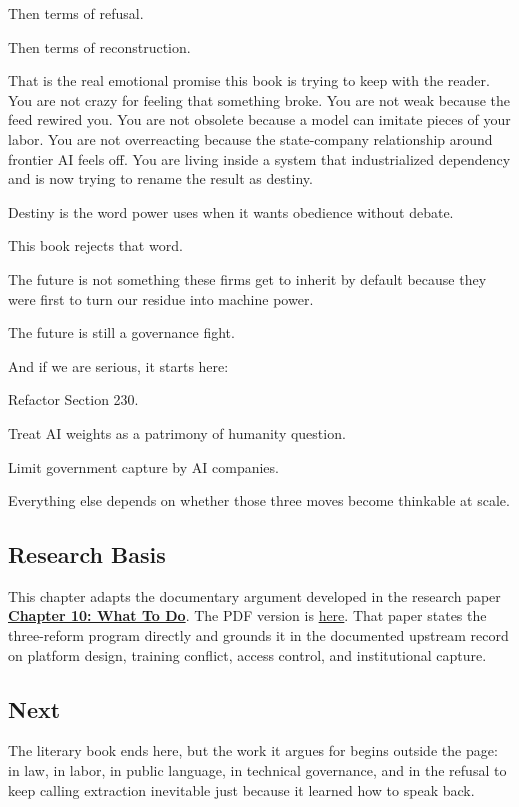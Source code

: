 \documentclass[
  american,
  12pt,
  letterpaper,
]{article}
\begin{document}
Then terms of refusal.

Then terms of reconstruction.

That is the real emotional promise this book is trying to keep with the
reader. You are not crazy for feeling that something broke. You are not
weak because the feed rewired you. You are not obsolete because a model
can imitate pieces of your labor. You are not overreacting because the
state-company relationship around frontier AI feels off. You are living
inside a system that industrialized dependency and is now trying to
rename the result as destiny.

Destiny is the word power uses when it wants obedience without debate.

This book rejects that word.

The future is not something these firms get to inherit by default
because they were first to turn our residue into machine power.

The future is still a governance fight.

And if we are serious, it starts here:

Refactor Section 230.

Treat AI weights as a patrimony of humanity question.

Limit government capture by AI companies.

Everything else depends on whether those three moves become thinkable at
scale.

\subsection{Research Basis}\label{research-basis-10}

This chapter adapts the documentary argument developed in the research
paper
\href{../../papers/html/10_three-reform-program_paper.html}{\textbf{Chapter
10: What To Do}}. The PDF version is
\href{../../papers/pdf/10_three-reform-program_paper/10_three-reform-program_paper.pdf}{here}.
That paper states the three-reform program directly and grounds it in
the documented upstream record on platform design, training conflict,
access control, and institutional capture.

\subsection{Next}\label{next-10}

The literary book ends here, but the work it argues for begins outside
the page: in law, in labor, in public language, in technical governance,
and in the refusal to keep calling extraction inevitable just because it
learned how to speak back.
\end{document}
